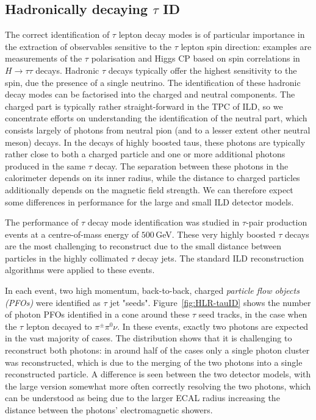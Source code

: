 \subsection[Hadronically decaying tau ID]{Hadronically decaying {\protect$\tau$ ID}}
\label{sec:perf:hlr:tau}

The correct identification of $\tau$ lepton decay modes is of particular importance in the extraction of observables sensitive to the $\tau$ lepton spin direction: examples are measurements of the $\tau$ polarisation and Higgs CP based on spin correlations in $H \to \tau \tau$ decays.
Hadronic $\tau$ decays typically offer the highest sensitivity to the spin, due the presence of a single neutrino. 
The identification of these hadronic decay modes can be factorised into the charged and neutral components. 
The charged part is typically rather straight-forward in the TPC of ILD, so we concentrate efforts on understanding the identification of the neutral part, which consists largely of photons from neutral pion (and to a lesser extent other neutral meson) decays. 
In the decays of highly boosted taus, these photons are typically rather close to both a charged particle and one or more additional photons produced in the same $\tau$ decay. 
The separation between these photons in the calorimeter depends on its inner radius, while the distance to charged particles additionally depends on the magnetic field strength. 
We can therefore expect some differences in performance for the large and small ILD detector models.

The performance of $\tau$ decay mode identification was studied in $\tau$-pair production events at a centre-of-mass energy of $500$\,GeV. 
These very highly boosted $\tau$ decays are the most challenging to reconstruct due to the small distance between particles in the highly collimated $\tau$ decay jets.
The standard ILD reconstruction algorithms were applied to these events.

In each event, two high momentum, back-to-back, charged \emph{particle flow objects  (PFOs)} were identified as $\tau$ jet "seeds". Figure~\ref{fig:HLR-tauID} shows the number of photon PFOs identified in a cone around these $\tau$ seed tracks, in the case when the $\tau$ lepton decayed to $\pi^\pm \pi^0 \nu$.
In these events, exactly two photons are expected in the vast majority of cases. 
The distribution shows that it is challenging to reconstruct both photons: in around half of the cases only a single photon cluster was reconstructed, which is due to the merging of the two photons into a single reconstructed particle. 
A difference is seen between the two detector models, with the large version somewhat more often correctly resolving the two photons, which can be understood as being due to the larger ECAL radius increasing the distance between the photons' electromagnetic showers.


